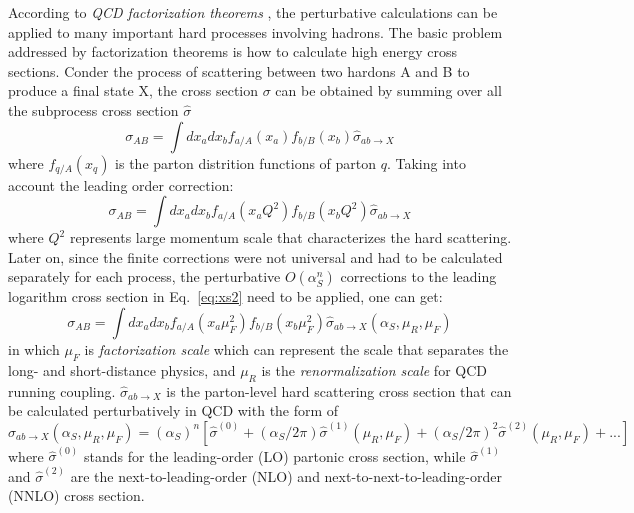 According to \textit{QCD factorization theorems} \cite{Collins:1989gx}, the perturbative calculations can be applied to many important
hard processes involving hadrons. The basic problem addressed by factorization theorems is how to calculate high energy cross sections.
Conder the process of scattering between two hardons A and B to produce a final state X, the cross section $\sigma$ can be obtained 
by summing over all the subprocess cross section $\hat{\sigma}$ \cite{Stirling:1194745}
\begin{equation}
	\sigma_{AB} = \int dx_{a} dx_{b} f_{a/A}\left(x_{a}\right) f_{b/B}\left(x_{b}\right) \hat{\sigma}_{ab\rightarrow X}
\end{equation}
where $f_{q/A}\left(x_{q}\right)$ is the parton distrition functions of parton $q$.
Taking into account the leading order correction:
\begin{equation} \label{eq:xs2}
	\sigma_{AB} = \int dx_{a} dx_{b} f_{a/A}\left(x_{a}Q^{2}\right) f_{b/B}\left(x_{b}Q^{2}\right) \hat{\sigma}_{ab\rightarrow X}
\end{equation}
where $Q^{2}$ represents large momentum scale that characterizes the hard scattering.
Later on, since the finite corrections were not universal and had to be calculated separately for each process,
the perturbative $O\left(\alpha_{S}^{n}\right)$ corrections to the leading logarithm cross section in Eq.~\ref{eq:xs2}
need to be applied, one can get:
\begin{equation}
	\sigma_{AB} = \int dx_{a} dx_{b} f_{a/A}\left(x_{a}\mu_{F}^{2}\right) f_{b/B}\left(x_{b}\mu_{F}^{2}\right) \hat{\sigma}_{ab\rightarrow X}\left(\alpha_{S},\mu_{R},\mu_{F}\right)
\end{equation}
in which $\mu_{F}$ is \textit{factorization scale} which can represent the scale that separates the long- and short-distance physics,
and $\mu_{R}$ is the \textit{renormalization scale} for QCD running coupling.
$\hat{\sigma}_{ab\rightarrow X}$ is the parton-level hard scattering cross section that can be calculated perturbatively in QCD with the form of
\begin{equation} \label{eq:xs3}
	\hat{\sigma}_{ab\rightarrow X}\left(\alpha_{S},\mu_{R},\mu_{F}\right) 
		= \left(\alpha_{S}\right)^{n} \left[ \hat{\sigma}^{(0)}
		+ \left(\alpha_{S}/2\pi\right) \hat{\sigma}^{(1)}\left(\mu_{R},\mu_{F}\right)
		+ \left(\alpha_{S}/2\pi\right)^{2} \hat{\sigma}^{(2)}\left(\mu_{R},\mu_{F}\right)
		+ ... \right]
\end{equation}
where $\hat{\sigma}^{(0)}$ stands for the leading-order (LO) partonic cross section,
while $\hat{\sigma}^{(1)}$ and $\hat{\sigma}^{(2)}$ are the next-to-leading-order (NLO) and
next-to-next-to-leading-order (NNLO) cross section.

